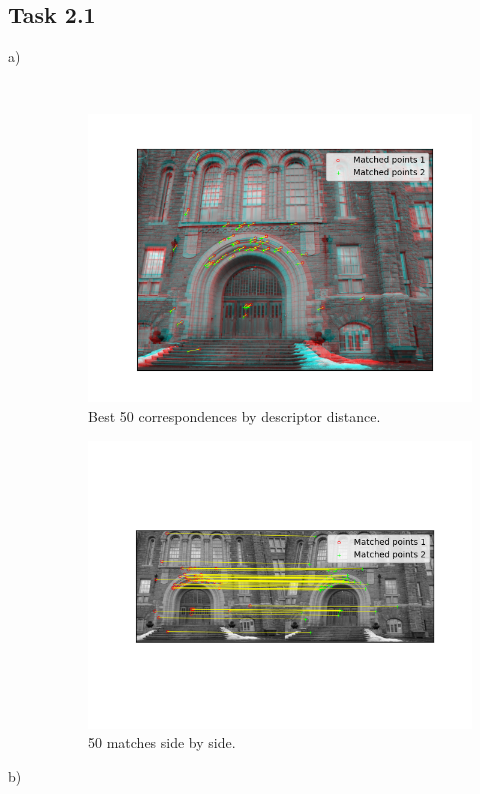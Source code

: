 \documentclass[a4paper]{article} %
\begin{document}
    \subsection*{Task 2.1}
    \begin{description}
        \item [a)]  \hfill \\
            \begin{figure}[H]
                \center
                \includegraphics[width= 0.7\linewidth]{Correspondence}
                \caption{Best 50 correspondences by descriptor distance.}
            \end{figure}
            \begin{figure}[H]
                \center
                \includegraphics[width= \linewidth]{Matches}
                \caption{50 matches side by side.}
                \end{figure}
        \item [b)]  \hfill \\

\end{description}
\end{document}
